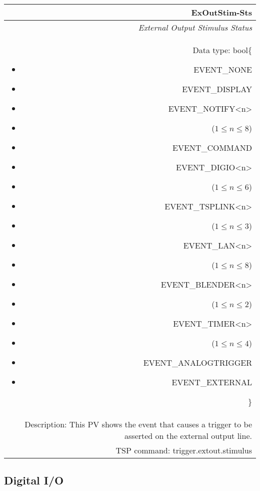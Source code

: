 \documentclass[openany]{article}
\begin{document}
		\begin{tabular}{N}
			\hline
			\bfseries ExOutStim-Sts\label{pv:exoutstim-sts} \\ \hline
			\emph{External Output Stimulus Status} \\
			Data type: bool\{\begin{itemize}[noitemsep]
				\small
				\item[] EVENT\_NONE
				\item[] EVENT\_DISPLAY
				\item[] EVENT\_NOTIFY\textless n\textgreater
				\item[] ($1\leq n\leq 8$)
				\item[] EVENT\_COMMAND
				\item[] EVENT\_DIGIO\textless n\textgreater
				\item[] ($1\leq n\leq 6$)
				\item[] EVENT\_TSPLINK\textless n\textgreater
				\item[] ($1\leq n\leq 3$)
				\item[] EVENT\_LAN\textless n\textgreater
				\item[] ($1\leq n\leq 8$)
				\item[] EVENT\_BLENDER\textless n\textgreater 
				\item[] ($1\leq n\leq 2$)
				\item[] EVENT\_TIMER\textless n\textgreater
				\item[] ($1\leq n\leq 4$)
				\item[] EVENT\_ANALOGTRIGGER
				\item[] EVENT\_EXTERNAL
			\end{itemize}\} \\
			Description: This PV shows the event that causes a trigger to be asserted on the external output line. \\
			TSP command: trigger.extout.stimulus
		\end{tabular}

	\subsection{Digital I/O}\label{pvgroup:digital-io}

		\paragraph{} %
\end{document}
